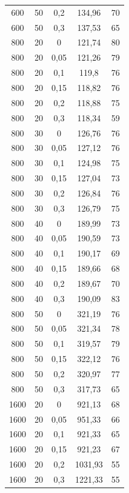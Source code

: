 \documentclass{article}
\begin{document}
\begin{longtable}{c|c|c|c|c}
600    & 50   & 0,2   & 134,96  & 70    \\
600    & 50   & 0,3   & 137,53  & 65    \\
800    & 20   & 0     & 121,74  & 80    \\
800    & 20   & 0,05  & 121,26  & 79    \\
800    & 20   & 0,1   & 119,8   & 76    \\
800    & 20   & 0,15  & 118,82  & 76    \\
800    & 20   & 0,2   & 118,88  & 75    \\
800    & 20   & 0,3   & 118,34  & 59    \\
800    & 30   & 0     & 126,76  & 76    \\
800    & 30   & 0,05  & 127,12  & 76    \\
800    & 30   & 0,1   & 124,98  & 75    \\
800    & 30   & 0,15  & 127,04  & 73    \\
800    & 30   & 0,2   & 126,84  & 76    \\
800    & 30   & 0,3   & 126,79  & 75    \\
800    & 40   & 0     & 189,99  & 73    \\
800    & 40   & 0,05  & 190,59  & 73    \\
800    & 40   & 0,1   & 190,17  & 69    \\
800    & 40   & 0,15  & 189,66  & 68    \\
800    & 40   & 0,2   & 189,67  & 70    \\
800    & 40   & 0,3   & 190,09  & 83    \\
800    & 50   & 0     & 321,19  & 76    \\
800    & 50   & 0,05  & 321,34  & 78    \\
800    & 50   & 0,1   & 319,57  & 79    \\
800    & 50   & 0,15  & 322,12  & 76    \\
800    & 50   & 0,2   & 320,97  & 77    \\
800    & 50   & 0,3   & 317,73  & 65    \\
1600   & 20   & 0     & 921,13  & 68    \\
1600   & 20   & 0,05  & 951,33  & 66    \\
1600   & 20   & 0,1   & 921,33  & 65    \\
1600   & 20   & 0,15  & 921,23  & 67    \\
1600   & 20   & 0,2   & 1031,93 & 55    \\
1600   & 20   & 0,3   & 1221,33 & 55    \\

\end{longtable}
\end{document}
